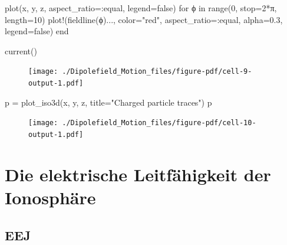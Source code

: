 \documentclass[
  a4paper,
  DIV=11]{scrreprt}
\newenvironment{Shaded}{\begin{snugshade}}{\end{snugshade}}
\newcommand{\ConstantTok}[1]{\textcolor[rgb]{0.56,0.35,0.01}{#1}}
\newcommand{\ControlFlowTok}[1]{\textcolor[rgb]{0.00,0.23,0.31}{#1}}
\newcommand{\FloatTok}[1]{\textcolor[rgb]{0.68,0.00,0.00}{#1}}
\newcommand{\FunctionTok}[1]{\textcolor[rgb]{0.28,0.35,0.67}{#1}}
\newcommand{\KeywordTok}[1]{\textcolor[rgb]{0.00,0.23,0.31}{#1}}
\newcommand{\NormalTok}[1]{\textcolor[rgb]{0.00,0.23,0.31}{#1}}
\newcommand{\OperatorTok}[1]{\textcolor[rgb]{0.37,0.37,0.37}{#1}}
\newcommand{\StringTok}[1]{\textcolor[rgb]{0.13,0.47,0.30}{#1}}
\begin{document}
\begin{Shaded}
\begin{Highlighting}[]
\FunctionTok{plot}\NormalTok{(x, y, z, aspect\_ratio}\OperatorTok{=:}\NormalTok{equal, legend}\OperatorTok{=}\ConstantTok{false}\NormalTok{)}
\ControlFlowTok{for}\NormalTok{ ϕ }\KeywordTok{in} \FunctionTok{range}\NormalTok{(}\FloatTok{0}\NormalTok{, stop}\OperatorTok{=}\FloatTok{2}\OperatorTok{*}\ConstantTok{π}\NormalTok{, length}\OperatorTok{=}\FloatTok{10}\NormalTok{)}
   \FunctionTok{plot!}\NormalTok{(}\FunctionTok{fieldline}\NormalTok{(ϕ)}\OperatorTok{...}\NormalTok{, color}\OperatorTok{=}\StringTok{"red"}\NormalTok{, aspect\_ratio}\OperatorTok{=:}\NormalTok{equal, alpha}\OperatorTok{=}\FloatTok{0.3}\NormalTok{, legend}\OperatorTok{=}\ConstantTok{false}\NormalTok{)}
\ControlFlowTok{end}

\FunctionTok{current}\NormalTok{()}
\end{Highlighting}
\end{Shaded}

\begin{figure}[H]

{\centering \texttt{[image: ./Dipolefield\_Motion\_files/figure-pdf/cell-9-output-1.pdf]}

}

\end{figure}

\begin{Shaded}
\begin{Highlighting}[]
\NormalTok{p }\OperatorTok{=} \FunctionTok{plot\_iso3d}\NormalTok{(x, y, z, title}\OperatorTok{=}\StringTok{"Charged particle traces"}\NormalTok{)}
\NormalTok{p}
\end{Highlighting}
\end{Shaded}

\begin{figure}[H]

{\centering \texttt{[image: ./Dipolefield\_Motion\_files/figure-pdf/cell-10-output-1.pdf]}

}

\end{figure}

\part{Die elektrische Leitfähigkeit der Ionosphäre}

\hypertarget{eej}{%
\chapter{EEJ}\label{eej}}
\end{document}
